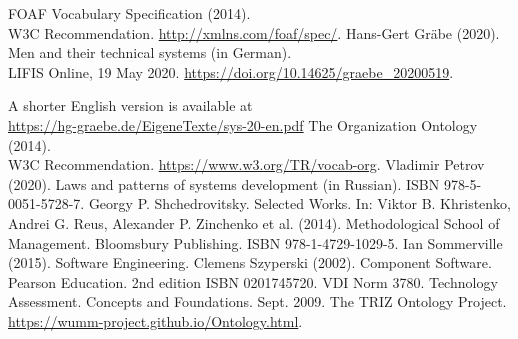 \documentclass[11pt,a4paper]{article}
\begin{document}
\begin{thebibliography}{xxx}
 FOAF Vocabulary Specification (2014).\\ W3C Recommendation.
  \url{http://xmlns.com/foaf/spec/}.
 Hans-Gert Gräbe (2020). Men and their technical systems
  (in German).\\ LIFIS Online, 19 May 2020.
  \url{https://doi.org/10.14625/graebe_20200519}.

  A shorter English version is available at\\
  \url{https://hg-graebe.de/EigeneTexte/sys-20-en.pdf}
 The Organization Ontology (2014).\\  W3C Recommendation.
  \url{https://www.w3.org/TR/vocab-org}.
 Vladimir Petrov (2020). Laws and patterns of systems
  development (in Russian). ISBN 978-5-0051-5728-7.
 Georgy P. Shchedrovitsky. Selected Works. In: Viktor
  B. Khristenko, Andrei G. Reus, Alexander P. Zinchenko et al. (2014).
  Methodological School of Management. Bloomsbury Publishing.  ISBN
  978-1-4729-1029-5.
 Ian Sommerville (2015). Software Engineering.
 Clemens Szyperski (2002). Component Software. Pearson
  Education.  2nd edition  ISBN 0201745720.
 VDI Norm 3780. Technology Assessment. Concepts and Foundations.
  Sept. 2009.
 The TRIZ Ontology Project.
  \url{https://wumm-project.github.io/Ontology.html}.
\end{thebibliography}
\end{document}

